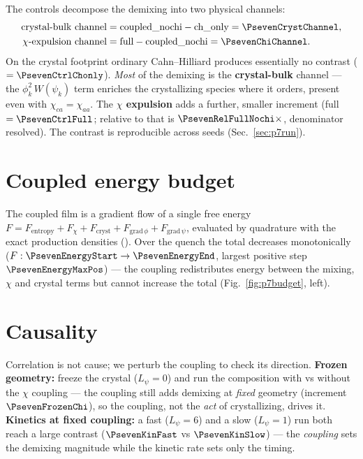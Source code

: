 The controls decompose the demixing into two physical channels:
%
\begin{align}
  \text{crystal-bulk channel} &=
     \text{coupled\_nochi} - \text{ch\_only}
     = \ensuremath{\PsevenCrystChannel}, \\
  \text{$\chi$-expulsion channel} &=
     \text{full} - \text{coupled\_nochi}
     = \ensuremath{\PsevenChiChannel}.
\end{align}
%
On the crystal footprint ordinary Cahn--Hilliard produces essentially no
contrast ( $=\ensuremath{\PsevenCtrlChonly}$). \emph{Most}
of the demixing is the \textbf{crystal-bulk} channel --- the
$\phi_k^2\,W(\psi_k)$ term enriches the crystallizing species where it
orders, present even with $\chi_{ca}{=}\chi_{aa}$. The \textbf{$\chi$
expulsion} adds a further, smaller increment (full
$=\ensuremath{\PsevenCtrlFull}$; relative to  that is
$\ensuremath{\PsevenRelFullNochi}\times$, denominator resolved). The
contrast is reproducible across seeds (Sec.~\ref{sec:p7run}).

\section{Coupled energy budget}

The coupled film is a gradient flow of a single free energy
$F=F_{\text{entropy}}+F_{\chi}+F_{\text{cryst}}+F_{\text{grad}\,\phi}
+F_{\text{grad}\,\psi}$, evaluated by quadrature with the exact production
densities (). Over the quench the total decreases
monotonically ($F:\ensuremath{\PsevenEnergyStart}\to
\ensuremath{\PsevenEnergyEnd}$, largest positive step
$\ensuremath{\PsevenEnergyMaxPos}$) --- the coupling redistributes energy
between the mixing, $\chi$ and crystal terms but cannot increase the total
(Fig.~\ref{fig:p7budget}, left).

\section{Causality}

Correlation is not cause; we perturb the coupling to check its direction.
\textbf{Frozen geometry:} freeze the crystal ($L_\psi{=}0$) and run the
composition with vs without the $\chi$ coupling --- the coupling still adds
demixing at \emph{fixed} geometry (increment
$\ensuremath{\PsevenFrozenChi}$), so the coupling, not the \emph{act} of
crystallizing, drives it. \textbf{Kinetics at fixed coupling:} a fast
($L_\psi{=}6$) and a slow ($L_\psi{=}1$) run both reach a large contrast
($\ensuremath{\PsevenKinFast}$ vs $\ensuremath{\PsevenKinSlow}$) --- the
\emph{coupling} sets the demixing magnitude while the kinetic rate sets
only the timing.

